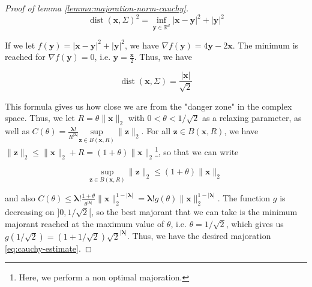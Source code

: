 ﻿\documentclass{article}
\begin{document}
\begin{proof}[Proof of lemma \ref{lemma:majoration-norm-cauchy}]
\begin{equation*}
  \operatorname{dist}(\bm x,\Sigma)^2 = \inf_{\bm y\in\mathbb R^d}|\bm x-\bm y|^2+|\bm y|^2
\end{equation*}

If we let $f(\bm y) = |\bm x-\bm y|^2+|\bm y|^2$, we have $\nabla f(\bm y) = 4\bm y - 2\bm x$. The minimum is reached for $\nabla f(\bm y) = 0$, i.e. $\bm y = \frac{\bm x}{2}$. Thus, we have

\begin{equation*}
  \boxed{\operatorname{dist}(\bm x,\Sigma) = \frac{|\bm x|}{\sqrt 2}}
\end{equation*}

This formula gives us how close we are from the "danger zone" in the complex space. Thus, we let $R = \theta\|\bm x\|_2$ with $0< \theta< 1/\sqrt{2}$ as a relaxing parameter, as well as $C(\theta) = \frac{\bm\lambda !}{R^{|\bm\lambda|}} \underset{\bm z\in B(\bm x, R)}{\text{sup}}\,\|\bm z\|_2$. For all $\bm z \in B(\bm x, R)$, we have $\|\bm z\|_2 \leq \|\bm x\|_2 + R = (1+\theta)\|\bm x\|_2$\footnote{Here, we perform a non optimal majoration.}, so that we can write 

$$\underset{\bm z\in B(\bm x, R)}{\text{sup}}\,\|\bm z\|_2 \leq (1+\theta)\|\bm x\|_2$$


and also $\displaystyle{C(\theta) \leq \bm\lambda !\frac{1+\theta}{\theta^{|\bm\lambda|}} \|\bm x\|_2^{1-|\bm\lambda|}} = \bm\lambda!g(\theta)\|\bm x\|_2^{1-|\bm\lambda|}$. The function $g$ is decreasing on $]0, 1/\sqrt{2}[$, so the best majorant that we can take is the minimum majorant reached at the maximum value of $\theta$, i.e. $\theta = 1/\sqrt{2}$, which gives us $g(1/\sqrt{2}) = (1 + 1/\sqrt{2})\sqrt 2^{|\bm\lambda|}$. Thus, we have the desired majoration \ref{eq:cauchy-estimate}.

\end{proof}
\end{document}
